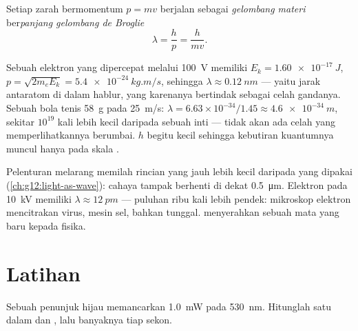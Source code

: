 \begin{definition}\label{def:g12:quantum-world:debroglie}
Setiap zarah bermomentum $p = mv$ berjalan sebagai \emph{gelombang
materi} ber\emph{panjang gelombang de Broglie}
\[
\lambda = \frac{h}{p} = \frac{h}{mv}.
\]
\end{definition}
\admitted

\begin{example}\label{ex:g12:quantum-world:never}
Sebuah elektron yang dipercepat melalui \qty{100}{V} memiliki $E_k = \qty{1.60e-17}{J}$,
$p = \sqrt{2m_e E_k} = \qty{5.4e-24}{kg.m/s}$, sehingga $\lambda \approx
\qty{0.12}{nm}$ --- yaitu jarak antaratom di dalam hablur, yang karenanya bertindak
sebagai celah gandanya. Sebuah bola tenis \qty{58}{g} pada \qty{25}{m/s}: $\lambda =
6.63\times10^{-34}/1.45 \approx \qty{4.6e-34}{m}$, sekitar $10^{19}$ kali
lebih kecil daripada sebuah inti --- tidak akan ada celah yang memperlihatkannya berumbai. $h$ begitu
kecil sehingga kebutiran kuantumnya muncul hanya pada skala .
\end{example}

\begin{example}\label{ex:g12:quantum-world:microscope}
Pelenturan melarang memilah rincian yang jauh lebih kecil daripada  yang dipakai
(\cref{ch:g12:light-as-wave}): cahaya tampak berhenti di dekat \qty{0.5}{\micro m}.
Elektron pada \qty{10}{kV} memiliki $\lambda \approx \qty{12}{pm}$ --- puluhan
ribu kali lebih pendek: mikroskop elektron mencitrakan virus, mesin
sel, bahkan  tunggal.  menyerahkan sebuah mata yang baru kepada fisika.
\end{example}

\section{Latihan}

\begin{exercise}[$\star$]\label{exo:g12:quantum-world:1}
Sebuah penunjuk  hijau memancarkan \qty{1.0}{mW} pada \qty{530}{nm}. Hitunglah
 satu  dalam  dan , lalu banyaknya  tiap sekon.
\end{exercise}

